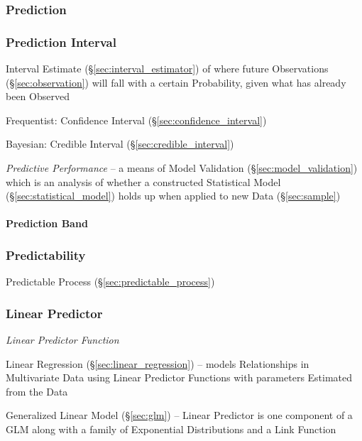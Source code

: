 \subsubsection{Prediction}\label{sec:prediction}

\subsubsection{Prediction Interval}\label{sec:prediction_interval}\hfill

Interval Estimate (\S\ref{sec:interval_estimator}) of where future Observations
(\S\ref{sec:observation}) will fall with a certain Probability, given what has
already been Observed

Frequentist: Confidence Interval (\S\ref{sec:confidence_interval})

Bayesian: Credible Interval (\S\ref{sec:credible_interval})

\emph{Predictive Performance} -- a means of Model Validation
(\S\ref{sec:model_validation}) which is an analysis of whether a constructed
Statistical Model (\S\ref{sec:statistical_model}) holds up when applied to new
Data (\S\ref{sec:sample})



\paragraph{Prediction Band}\label{sec:prediction_band}\hfill



\subsubsection{Predictability}\label{sec:predictability}

\fist Predictable Process (\S\ref{sec:predictable_process})



\subsubsection{Linear Predictor}\label{sec:linear_predictor}

\emph{Linear Predictor Function}

\fist Linear Regression (\S\ref{sec:linear_regression}) -- models Relationships
in Multivariate Data using Linear Predictor Functions with parameters Estimated
from the Data

\fist Generalized Linear Model (\S\ref{sec:glm}) -- Linear Predictor is one
component of a GLM along with a family of Exponential Distributions and a Link
Function

